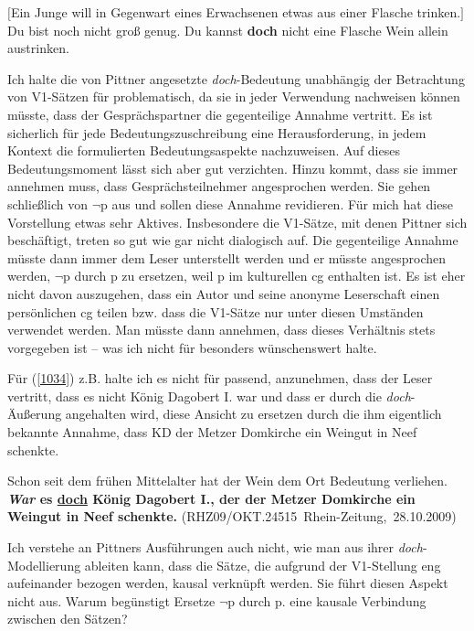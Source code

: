 {\begin{exe}
	\ex\label{1033} 
	$[$Ein Junge will in Gegenwart eines Erwachsenen etwas aus einer Flasche trinken.$]$
	Du bist noch nicht groß genug. Du kannst \textbf{doch} nicht eine Flasche Wein allein austrinken.			
	\hfill\hbox {\citet[168]{Pittner2011}}
\end{exe}
Ich halte die von Pittner angesetzte \textit{doch}-Bedeutung unabhängig der Betrachtung von V1-Sätzen für problematisch, da sie in jeder Verwendung nachweisen können müsste, dass der Gesprächspartner die gegenteilige Annahme vertritt. Es ist sicherlich für jede Bedeutungszuschreibung eine Herausforderung, in jedem Kontext die formulierten Bedeutungsaspekte nachzuweisen. Auf dieses Bedeutungsmoment lässt sich aber gut verzichten. Hinzu kommt, dass sie immer annehmen muss, dass Gesprächsteilnehmer angesprochen werden. Sie gehen schließlich von $\neg$p aus und sollen diese Annahme revidieren. Für mich hat diese Vorstellung etwas sehr Aktives. Insbesondere die V1-Sätze, mit denen Pittner sich beschäftigt, treten so gut wie gar nicht dialogisch auf. Die gegenteilige Annahme müsste dann immer dem Leser unterstellt werden und er müsste angesprochen werden, $\neg$p durch p zu ersetzen, weil p im kulturellen cg enthalten ist. Es ist eher nicht davon auszugehen, dass ein Autor und seine anonyme Leserschaft einen persönlichen cg teilen bzw. dass die V1-Sätze nur unter diesen Umständen verwendet werden. Man müsste dann annehmen, dass dieses Verhältnis stets vorgegeben ist – was ich nicht für besonders wünschenswert halte.

Für (\ref{1034}) z.B. halte ich es nicht für passend, anzunehmen, dass der Leser vertritt, dass es nicht König Dagobert I. war und dass er durch die \textit{doch}-Äußerung angehalten wird, diese Ansicht zu ersetzen durch die ihm eigentlich bekannte Annahme, dass KD der Metzer Domkirche ein Weingut in Neef schenkte.

\begin{exe}
	\ex\label{1034}
	\scriptsize 
	Schon seit dem frühen Mittelalter hat der Wein dem Ort Bedeutung verliehen. \textbf{\textit{War} es \underline{doch} König Dagobert I., der der Metzer 		Domkirche ein Weingut in Neef schenkte.}    
	\newline              		
	\hbox{}\hfill\hbox {(RHZ09/OKT.24515 Rhein-Zeitung, 28.10.2009)}
\end{exe}
Ich verstehe an Pittners Ausführungen auch nicht, wie man aus ihrer \textit{doch}-Model\-lierung ableiten kann, dass die Sätze, die aufgrund der V1-Stellung eng aufeinander bezogen werden, kausal verknüpft werden. Sie führt diesen Aspekt nicht aus. Warum begünstigt \glq Ersetze $\neg$p durch p.\grq{} eine kausale Verbindung zwischen den Sätzen?

}
